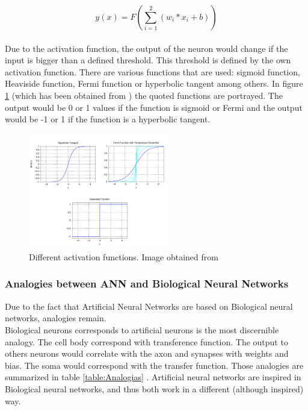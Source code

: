 			\begin{equation}
			y(x)=F(\sum_{i=1}^{2} (w_{i}*x_{i} + b) )
			\label{eq:ecuation_neuronasencilla}
			\end{equation}\\

Due to the activation function, the output of the neuron would change if the input is bigger than a defined threshold. This threshold is defined by the own activation function. There are various functions that are used: sigmoid function, Heaviside function, Fermi function or hyperbolic tangent among others. In figure \ref{fig:activation_function} (which has been obtained from \cite{BINN}) the quoted functions are portrayed. The output would be 0 or 1 values if the function is sigmoid or Fermi and the output would be -1 or 1 if the function is a hyperbolic tangent. \\

\begin{figure}[htb]
\centering
\includegraphics[width=0.55\textwidth]{images_miscelaneus/activation_function.PNG}
\caption{Different activation functions. Image obtained from \cite{BINN}} \label{fig:activation_function}
\end{figure}

\subsubsection{Analogies between ANN and Biological Neural Networks}
Due to the fact that Artificial Neural Networks are based on Biological neural networks, analogies remain.\\

Biological neurons corresponds to artificial neurons is the most discernible analogy. The cell body correspond with transference function. The output to others neurons would correlate with the axon and synapses with weights and bias. The soma would correspond with the transfer function. Those analogies are summarized in table \ref{table:Analogias} \cite{Analogies}. Artificial neural networks are inspired in Biological neural networks, and thus both work in a different (although inspired) way.\\

